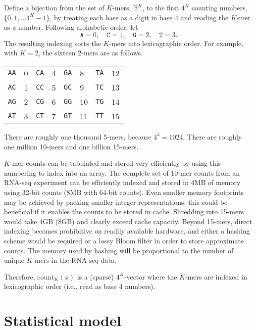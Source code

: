 \documentclass[11pt]{article}
\begin{document}
Define a bijection from the set of $K$-mers, $\mathbb{B}^K$, to the
first $4^K$ counting numbers, $\{ 0, 1, \ldots 4^K-1 \}$,
by treating each base as a digit in base 4 and reading the
$K$-mer as a number.  Following alphabetic order, let
\[
  \texttt{A} = 0,
  \quad \texttt{C} = 1,
  \quad \texttt{G} = 2,
  \quad \texttt{T} = 3.
\]
The resulting indexing sorts the $K$-mers into lexicographic order.
For example, with $K = 2$, the sixteen 2-mers are as follows.

\begin{center}
\begin{tabular}{ll|ll|ll|ll}
  \texttt{AA} & 0 & \texttt{CA} & 4 &   \texttt{GA} & 8 & \texttt{TA} & 12
  \\
  \texttt{AC} & 1 & \texttt{CC} & 5 &   \texttt{GC} & 9 & \texttt{TC} & 13
  \\
  \texttt{AG} & 2 & \texttt{CG} & 6 &   \texttt{GG} & 10 & \texttt{TG} & 14
  \\
  \texttt{AT} & 3 & \texttt{CT} & 7 &   \texttt{GT} & 11 & \texttt{TT} & 15
\end{tabular}
\end{center}
There are roughly one thousand 5-mers, because $4^5 = 1024$.  There are
roughly one million 10-mers and one billion 15-mers.

$K$-mer counts can be tabulated and stored very efficiently by using
this numbering to index into an array.  The complete set of 10-mer
counts from an RNA-seq experiment can be efficiently indexed and
stored in 4MB of memory using 32-bit counts (8MB with 64-bit counts).
Even smaller memory footprints may be achieved by packing smaller
integer representations; this could be beneficial if it enables the
counts to be stored in cache.  Shredding into 15-mers would take 4GB
(8GB) and clearly exceed cache capacity.  Beyond 15-mers, direct
indexing becomes prohibitive on readily available hardware, and either
a hashing scheme would be required or a lossy Bloom filter in order to
store approximate counts.  The memory used by hashing will be
proportional to the number of unique $K$-mers in the RNA-seq data.

Therefore,
$\textrm{count}_K(x)$ is a (sparse) $4^K$-vector where the
$K$-mers are indexed in lexicographic order (i.e., read as base 4
numbers).


\section{Statistical model}
\end{document}
